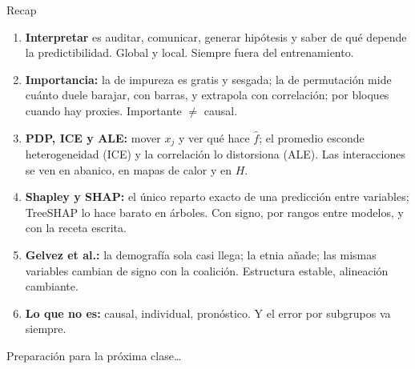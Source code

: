 \documentclass{beamer}
\newcommand{\1}{\mathbb{I}}
\begin{document}
\begin{frame}{Recap}
\small
\begin{enumerate}\itemsep3pt
  \item \textbf{Interpretar} es auditar, comunicar, generar hipótesis y saber de qué depende la predictibilidad. Global y local. Siempre fuera del entrenamiento.
  \item \textbf{Importancia:} la de impureza es gratis y sesgada; la de permutación mide cuánto duele barajar, con barras, y extrapola con correlación; por bloques cuando hay proxies. Importante $\neq$ causal.
  \item \textbf{PDP, ICE y ALE:} mover $x_j$ y ver qué hace $\hat{f}$; el promedio esconde heterogeneidad (ICE) y la correlación lo distorsiona (ALE). Las interacciones se ven en abanico, en mapas de calor y en $H$.
  \item \textbf{Shapley y SHAP:} el único reparto exacto de una predicción entre variables; TreeSHAP lo hace barato en árboles. Con signo, por rangos entre modelos, y con la receta escrita.
  \item \textbf{Gelvez et al.:} la demografía sola casi llega; la etnia añade; las mismas variables cambian de signo con la coalición. Estructura estable, alineación cambiante.
  \item \textbf{Lo que no es:} causal, individual, pronóstico. Y el error por subgrupos va siempre.
\end{enumerate}
\end{frame}

\begin{frame}
\vspace{2.0cm}
\Large{Preparación para la próxima clase\ldots}
\end{frame}

\end{document}
